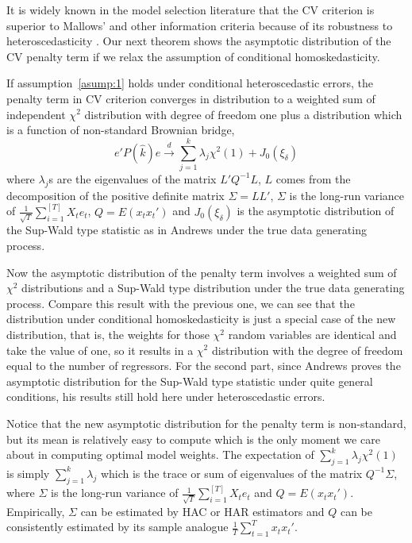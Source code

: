 \documentclass[a4paper,12pt]{article}
\newcommand{\jian}{\sum_{i=1}^{[T]}}
\newcommand{\rn}{\frac{1}{\sqrt{T}}}
\begin{document}
It is widely known in the model selection literature that the CV criterion is superior to Mallows' and other information criteria because of its robustness to heteroscedasticity \cite{andrews_JE1991}. Our next theorem shows the asymptotic distribution of the CV penalty term if we relax the assumption of conditional homoskedasticity.
\begin{theorem} \label{thm:2}
If assumption~\ref{asump:1} holds under conditional heteroscedastic errors, the penalty term in CV criterion converges in distribution to a weighted sum of independent $\chi^2$ distribution with degree of freedom one plus a distribution which is a function of non-standard Brownian bridge,
\begin{equation}
	e'P(\hat{k})e \stackrel{d}{\rightarrow} \sum_{j=1}^{k} \lambda_j \chi^2(1) + J_0(\xi_{\delta})
\end{equation}
where $\lambda_j$s are the eigenvalues of the matrix $L'Q^{-1}L$, $L$ comes from the decomposition of the positive definite matrix $\Sigma = LL'$, $\Sigma$ is the long-run variance of $\rn\jian X_t e_t$, $Q = E(x_t x_t')$ and $J_0(\xi_{\delta})$ is the asymptotic distribution of the Sup-Wald type statistic as in Andrews \cite{andrews93} under the true data generating process.
\end{theorem}
Now the asymptotic distribution of the penalty term involves a weighted sum of $\chi^2$ distributions and a Sup-Wald type distribution under the true data generating process. Compare this result with the previous one, we can see that the distribution under conditional homoskedasticity is just a special case of the new distribution, that is, the weights for those $\chi^2$ random variables are identical and take the value of one, so it results in a $\chi^2$ distribution with the degree of freedom equal to the number of regressors. For the second part, since Andrews \cite{andrews93} proves the asymptotic distribution for the Sup-Wald type statistic under quite general conditions, his results still hold here under heteroscedastic errors.

Notice that the new asymptotic distribution for the penalty term is non-standard, but its mean is relatively easy to compute which is the only moment we care about in computing optimal model weights. The expectation of $\sum_{j=1}^{k} \lambda_j \chi^2(1)$ is simply $\sum_{j=1}^{k} \lambda_j$ which is the trace or sum of eigenvalues of the matrix $Q^{-1} \Sigma$, where $\Sigma$ is the long-run variance of $\rn\jian X_t e_t$ and $Q = E(x_t x_t')$. Empirically, $\Sigma$ can be estimated by HAC or HAR estimators and $Q$ can be consistently estimated by its sample analogue $\frac{1}{T}\sum_{t=1}^{T}x_t x_t'$.
\end{document}
